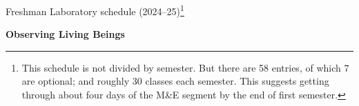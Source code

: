\documentclass{article}
\begin{document}
\thispagestyle{empty}
\pagestyle{fancy}
\fancyhead{}
\noindent Freshman Laboratory schedule (2024--25)\footnote{This schedule is not divided by semester. But there are 58 entries, of which 7 are optional; and roughly 30 classes each semester. This suggests getting through about four days of the M\&E segment by the end of first semester.}

\smallskip

\begin{center}
\textbf{Observing Living Beings}
\end{center}
\end{document}
